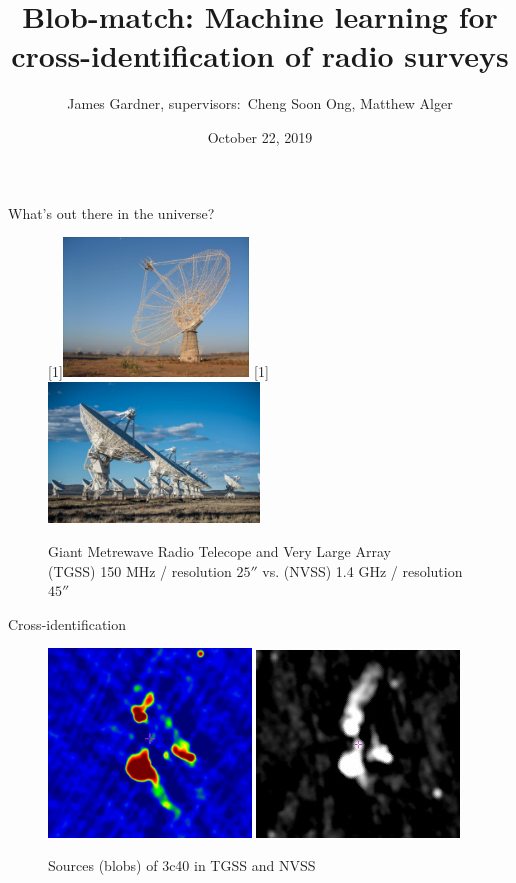\documentclass[12pt]{beamer}
\title[Blob-match]{Blob-match: Machine learning for cross-identification of radio surveys}
\author[James Gardner]{James Gardner, supervisors:\ Cheng Soon Ong, Matthew Alger}
\date{October 22, 2019}
\begin{document}
\begin{frame}
\titlepage
\end{frame}

\begin{frame}{What's out there in the universe?}
\begin{figure}
    \centering
    \scalebox{-1}[1]{\includegraphics[width=0.44\textwidth]{pics/GMRT.pdf}} \;\;
    \scalebox{-1}[1]{\includegraphics[width=0.5\textwidth]{pics/VLA.pdf}}
    \caption{Giant Metrewave Radio Telecope and Very Large Array\\
    (TGSS) 150 MHz / resolution $\ang{;;25}$ vs. (NVSS) 1.4 GHz / resolution $\ang{;;45}$}
\end{figure}
\end{frame}

\begin{frame}{Cross-identification}
\begin{figure}
    \centering
    \includegraphics[width=0.48\textwidth]{pics/3c40t-cropped.pdf} \;\;
    \includegraphics[width=0.48\textwidth]{pics/3c40n-cropped.pdf}
    \caption{Sources (blobs) of 3c40 in TGSS and NVSS}
\end{figure}
\end{frame}
\end{document}

